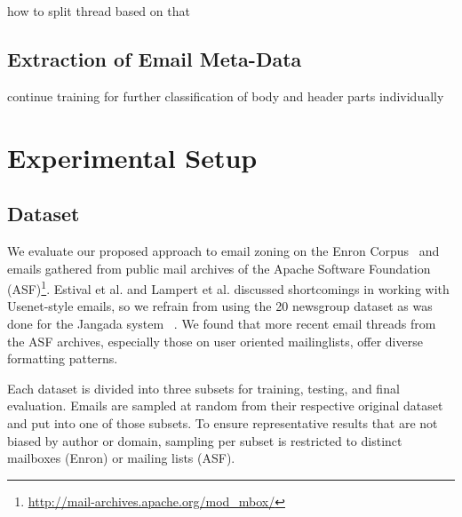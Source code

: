 \documentclass{llncs}
\begin{document}
how to split thread based on that

\subsection{Extraction of Email Meta-Data}
continue training for further classification of body and header parts individually

\section{Experimental Setup}

\subsection{Dataset}
We evaluate our proposed approach to email zoning on the Enron Corpus~\cite{enron} and emails gathered from public mail archives of the Apache Software Foundation (ASF)\footnote{\url{http://mail-archives.apache.org/mod\_mbox/}}. 
Estival et al. and Lampert et al. discussed shortcomings in working with Usenet-style emails, so we refrain from using the 20 newsgroup dataset as was done for the Jangada system ~\cite{profiling,zones,20news}.
We found that more recent email threads from the ASF archives, especially those on user oriented mailinglists, offer diverse formatting patterns.

Each dataset is divided into three subsets for training, testing, and final evaluation.
Emails are sampled at random from their respective original dataset and put into one of those subsets.
To ensure representative results that are not biased by author or domain, sampling per subset is restricted to distinct mailboxes (Enron) or mailing lists (ASF).
\end{document}
